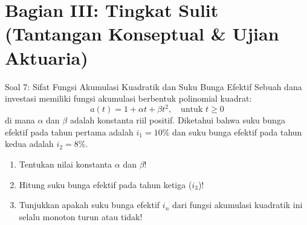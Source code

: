 \documentclass[11pt,a4paper]{article}
\begin{document}
\newpage
\section*{Bagian III: Tingkat Sulit (Tantangan Konseptual \& Ujian Aktuaria)}

\begin{problembox}{Soal 7: Sifat Fungsi Akumulasi Kuadratik dan Suku Bunga Efektif}
Sebuah dana investasi memiliki fungsi akumulasi berbentuk polinomial kuadrat:
\begin{equation*}
    a(t) = 1 + \alpha t + \beta t^2, \quad \text{untuk } t \ge 0
\end{equation*}
di mana $\alpha$ dan $\beta$ adalah konstanta riil positif. Diketahui bahwa suku bunga efektif pada tahun pertama adalah $i_1 = 10\%$ dan suku bunga efektif pada tahun kedua adalah $i_2 = 8\%$.
\begin{enumerate}[label=(\alph*)]
    \item Tentukan nilai konstanta $\alpha$ dan $\beta$!
    \item Hitung suku bunga efektif pada tahun ketiga ($i_3$)!
    \item Tunjukkan apakah suku bunga efektif $i_n$ dari fungsi akumulasi kuadratik ini selalu monoton turun atau tidak!
\end{enumerate}
\end{problembox}
\end{document}
